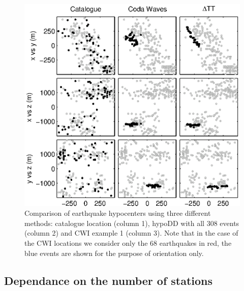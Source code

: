 \documentclass[extra]{gji}
\begin{document}

\begin{figure}
\includegraphics{diags/CalaverasLoc1_hypoDD_SVD.eps}
\caption{Comparison of earthquake hypocenters using three different methods: catalogue location (column 1), hypoDD with all
308 events (column 2) and CWI example 1 (column 3).
Note that in the case of the CWI locations we consider only the 68 earthquakes in red, the
blue events are shown for the purpose of orientation only.}
\label{fig-69Calaverasevents_eg1}
\end{figure}



\subsection{Dependance on the number of stations}
\end{document}
